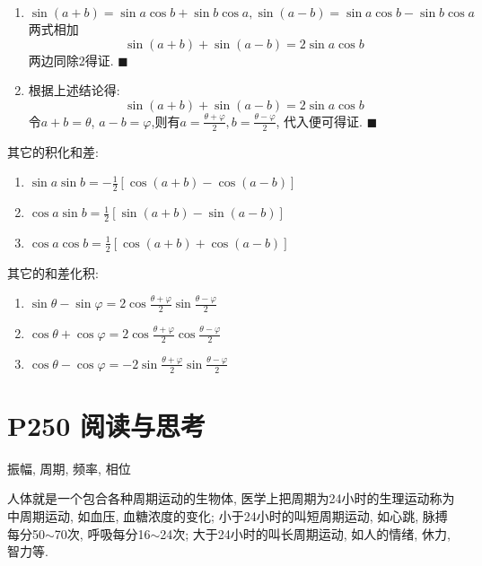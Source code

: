 \documentclass{book}
\begin{document}
    \begin{enumerate}
        \item $$\sin (a+b)=\sin a\cos b+\sin b \cos a, \sin (a-b)=\sin a\cos b-\sin b \cos a$$\textcolor[rgb]{0.75,0.17,0.22}{两式相加}$$\sin(a+b)+\sin(a-b)=2\sin a\cos b$$两边同除2得证. $\blacksquare$
        \item 根据上述结论得:$$\sin(a+b) +\sin(a-b)=2\sin a\cos b$$\textcolor[rgb]{0.75,0.17,0.22}{令$a+b=\theta$, $a-b=\varphi$,则有$\displaystyle a=\frac{\theta+\varphi}{2},b=\frac{\theta-\varphi}{2}$}, 代入便可得证. $\blacksquare$
    \end{enumerate}

    其它的\textcolor[rgb]{0.38,0.11,0.2}{积化和差}:
    \begin{enumerate}
        \item $\displaystyle \sin a\sin b=-\frac{1}{2}[\cos(a+b)-\cos(a-b)]$
        \item $\displaystyle \cos a\sin b=\frac{1}{2}[\sin(a+b)-\sin(a-b)]$
        \item $\displaystyle \cos a\cos b=\frac{1}{2}[\cos(a+b) +\cos(a-b)]$
    \end{enumerate}

    其它的\textcolor[rgb]{0.38,0.11,0.2}{和差化积}:

    \begin{enumerate}
        \item $\displaystyle \sin \theta-\sin \varphi=2\cos\frac{\theta+\varphi}{2}\sin\frac{\theta-\varphi}{2}$
        \item $\displaystyle \cos \theta+\cos \varphi=2\cos \frac{\theta+\varphi}{2} \cos \frac{\theta-\varphi}{2}$
        \item $\displaystyle \cos \theta-\cos \varphi=-2\sin \frac{\theta+\varphi}{2} \sin \frac{\theta-\varphi}{2}$
    \end{enumerate}

    \section{\textcolor[rgb]{0.11,0.65,0.52}{P250 阅读与思考}}
    
    \begin{center}
        振幅, 周期, 频率, 相位
    \end{center}

    人体就是一个包合各种周期运动的生物体, 医学上把周期为24小时的生理运动称为中周期运动, 如血压, 血糖浓度的变化; 小于24小时的叫短周期运动,  如心跳, 脉搏每分50$\sim$70次, 呼吸每分16$\sim$24次; 大于24小时的叫长周期运动, 如人的情绪, 休力, 智力等. 
    
\end{document}
